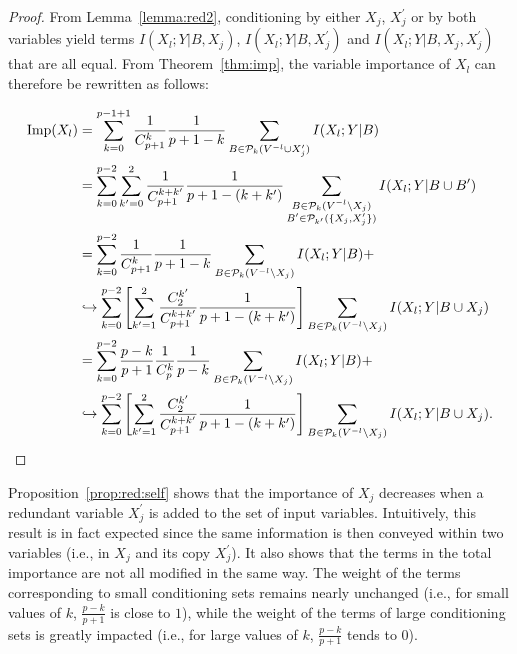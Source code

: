 \begin{proof}
From Lemma~\ref{lemma:red2}, conditioning by either $X_j$, $X_j^\prime$ or by
both  variables yield terms $I(X_l;Y|B,X_j)$, $I(X_l;Y|B,X_j^\prime)$ and
$I(X_l;Y|B,X_j,X_j^\prime)$ that are all equal. From Theorem~\ref{thm:imp}, the
variable importance of $X_l$ can therefore be rewritten as follows:

\begin{align}
\text{Imp}(X_l) &= \sum_{k=0}^{p-1+1} \frac{1}{C_{p+1}^k} \frac{1}{p+1-k} \sum_{B \in {\cal P}_k(V^{-l}\cup X_j^\prime)} I(X_l;Y|B) \nonumber \\
           &= \sum_{k=0}^{p-2} \sum_{k'=0}^2 \frac{1}{C_{p+1}^{k+k'}} \frac{1}{p+1-(k+k')} \sum_{\substack{B \in {\cal P}_k(V^{-l} \setminus X_j)\\ B' \in {\cal P}_{k'}(\{X_j, X_j^\prime\})} } I(X_l;Y|B \cup B') \nonumber \\
           &= \sum_{k=0}^{p-2} \frac{1}{C_{p+1}^k} \frac{1}{p+1-k} \sum_{B \in {\cal P}_k(V^{-l} \setminus X_j)} I(X_l;Y|B) + \nonumber \\
           & \hookrightarrow \sum_{k=0}^{p-2} \left[ \sum_{k'=1}^2 \frac{C^{k'}_2}{C_{p+1}^{k+k'}} \frac{1}{p+1-(k+k')} \right] \sum_{B \in {\cal P}_k(V^{-l} \setminus X_j)} I(X_l;Y|B \cup X_j) \nonumber \\
           &= \sum_{k=0}^{p-2} \frac{p-k}{p+1} \frac{1}{C_p^k} \frac{1}{p-k} \sum_{B \in {\cal P}_k(V^{-l} \setminus X_j)} I(X_l;Y|B) + \nonumber \\
           & \hookrightarrow \sum_{k=0}^{p-2}  \left[ \sum_{k'=1}^2 \frac{C^{k'}_2}{C_{p+1}^{k+k'}} \frac{1}{p+1-(k+k')} \right]  \sum_{B \in {\cal P}_k(V^{-l}\setminus X_j)} I(X_l;Y|B\cup X_j). \nonumber
\end{align}
\end{proof}

Proposition~\ref{prop:red:self} shows that the importance of $X_j$ decreases
when a redundant variable $X_j^\prime$ is added to the set of input variables.
Intuitively, this result is in fact expected since the same information is then
conveyed within two variables (i.e., in $X_j$ and its copy $X_j^\prime$). It
also shows that the terms in the total importance are not all modified in the
same way. The weight of the terms corresponding to small conditioning sets
remains nearly unchanged (i.e., for small values of $k$, $\tfrac{p-k}{p+1}$ is
close to $1$), while the weight of the terms of large conditioning sets is
greatly impacted (i.e., for large values of $k$, $\tfrac{p-k}{p+1}$ tends to
$0$).

